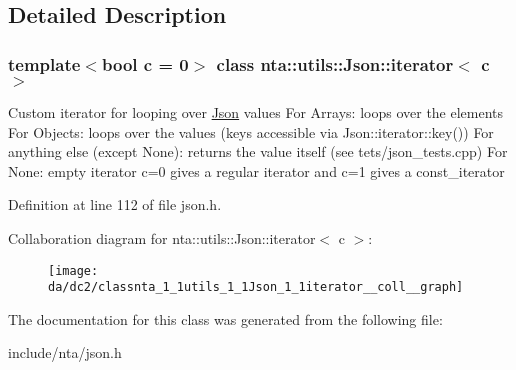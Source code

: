\subsection{Detailed Description}
\subsubsection*{template$<$bool c = 0$>$\newline
class nta\+::utils\+::\+Json\+::iterator$<$ c $>$}

Custom iterator for looping over \hyperlink{classnta_1_1utils_1_1Json}{Json} values For Arrays\+: loops over the elements For Objects\+: loops over the values (keys accessible via Json\+::iterator\+::key()) For anything else (except None)\+: returns the value itself (see tets/json\+\_\+tests.\+cpp) For None\+: empty iterator c=0 gives a regular iterator and c=1 gives a const\+\_\+iterator 

Definition at line 112 of file json.\+h.



Collaboration diagram for nta\+:\+:utils\+:\+:Json\+:\+:iterator$<$ c $>$\+:\nopagebreak
\begin{figure}[H]
\begin{center}
\leavevmode
\texttt{[image: da/dc2/classnta\_1\_1utils\_1\_1Json\_1\_1iterator\_\_coll\_\_graph]}
\end{center}
\end{figure}


The documentation for this class was generated from the following file\+:\begin{DoxyCompactItemize}
\item 
include/nta/json.\+h\end{DoxyCompactItemize}
